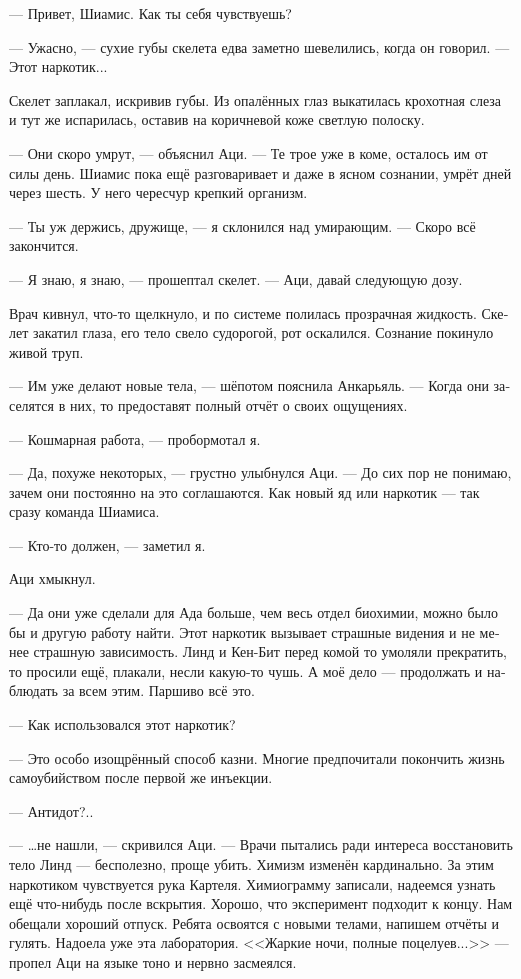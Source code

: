 \documentclass[a4paper,12pt,fleqn]{book}\usepackage{polyglossia}\setdefaultlanguage[babelshorthands=true]{russian}\setotherlanguage{english}\defaultfontfeatures{Ligatures=TeX,Mapping=tex-text}\usepackage{xcolor}\newcommand{\ml}[3]{#2}
\begin{document}
{--- Привет, Шиамис.
Как ты себя чувствуешь?

--- Ужасно, --- сухие губы скелета едва заметно шевелились, когда он говорил.
--- Этот наркотик...

Скелет заплакал, искривив губы.
Из опалённых глаз выкатилась крохотная слеза и тут же испарилась, оставив на коричневой коже светлую полоску.

--- Они скоро умрут, --- объяснил Аци.
--- Те трое уже в коме, осталось им от силы день.
Шиамис пока ещё разговаривает и даже в ясном сознании, умрёт дней через шесть.
У него чересчур крепкий организм.

--- Ты уж держись, дружище, --- я склонился над умирающим.
--- Скоро всё закончится.

--- Я знаю, я знаю, --- прошептал скелет.
--- Аци, давай следующую дозу.

Врач кивнул, что-то щелкнуло, и по системе полилась прозрачная жидкость.
Скелет закатил глаза, его тело свело судорогой, рот оскалился.
Сознание покинуло живой труп.

--- Им уже делают новые тела, --- шёпотом пояснила Анкарьяль.
--- Когда они заселятся в них, то предоставят полный отчёт о своих ощущениях.

--- Кошмарная работа, --- пробормотал я.

--- Да, похуже некоторых, --- грустно улыбнулся Аци.
--- До сих пор не понимаю, зачем они постоянно на это соглашаются.
Как новый яд или наркотик --- так сразу команда Шиамиса.

--- Кто-то должен, --- заметил я.

Аци хмыкнул.

--- Да они уже сделали для Ада больше, чем весь отдел биохимии, можно было бы и другую работу найти.
Этот наркотик вызывает страшные видения и не менее страшную зависимость.
Линд и Кен-Бит перед комой то умоляли прекратить, то просили ещё, плакали, несли какую-то чушь.
А моё дело --- продолжать и наблюдать за всем этим.
Паршиво всё это.

--- Как использовался этот наркотик?

--- Это особо изощрённый способ казни.
Многие предпочитали покончить жизнь самоубийством после первой же инъекции.

--- Антидот?..

--- \ldots не нашли, --- скривился Аци.
--- Врачи пытались ради интереса восстановить тело Линд --- бесполезно, проще убить.
Химизм изменён кардинально.
За этим наркотиком чувствуется рука Картеля.
Химиограмму записали, надеемся узнать ещё что-нибудь после вскрытия.
Хорошо, что эксперимент подходит к концу.
Нам обещали хороший отпуск.
Ребята освоятся с новыми телами, напишем отчёты и гулять.
Надоела уже эта лаборатория.
<<Жаркие ночи, полные поцелуев...>> --- пропел Аци на языке тоно и нервно засмеялся.

}
\end{document}
